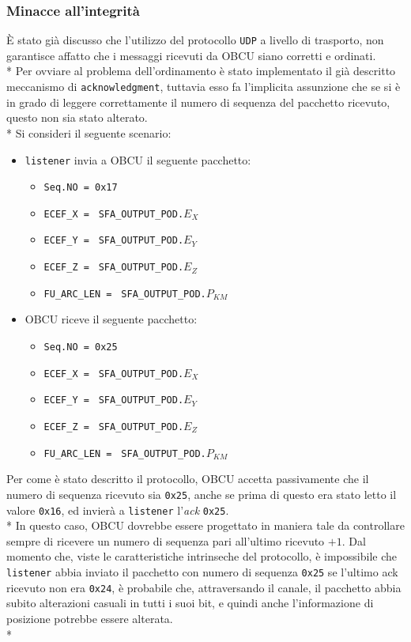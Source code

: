 \subsubsection{Minacce all'integrit\`a}
\`E stato gi\`a discusso che l'utilizzo del protocollo \texttt{UDP} a livello di trasporto, non garantisce affatto che i messaggi ricevuti da OBCU siano corretti e ordinati.\\*
Per ovviare al problema dell'ordinamento \`e stato implementato il gi\`a descritto meccanismo di \texttt{acknowledgment}, tuttavia esso fa l'implicita assunzione che se si \`e in grado di leggere correttamente il numero di sequenza del pacchetto ricevuto, questo non sia stato alterato.\\*
Si consideri il seguente scenario:
\begin{itemize}
	\item \texttt{listener} invia a OBCU il seguente pacchetto:
	\begin{itemize}
		\item \texttt{Seq.NO = 0x17}
		\item \texttt{ECEF\_X = } \texttt{SFA\_OUTPUT\_POD.}$E_X$
		\item \texttt{ECEF\_Y = } \texttt{SFA\_OUTPUT\_POD.}$E_Y$
		\item \texttt{ECEF\_Z = } \texttt{SFA\_OUTPUT\_POD.}$E_Z$
		\item \texttt{FU\_ARC\_LEN = } \texttt{SFA\_OUTPUT\_POD.}$P_{KM}$
	\end{itemize}
	\item OBCU riceve il seguente pacchetto:
\begin{itemize}
	\item \texttt{Seq.NO = 0x25}
	\item \texttt{ECEF\_X = } \texttt{SFA\_OUTPUT\_POD.}$E_X$
	\item \texttt{ECEF\_Y = } \texttt{SFA\_OUTPUT\_POD.}$E_Y$
	\item \texttt{ECEF\_Z = } \texttt{SFA\_OUTPUT\_POD.}$E_Z$
	\item \texttt{FU\_ARC\_LEN = } \texttt{SFA\_OUTPUT\_POD.}$P_{KM}$
\end{itemize}
\end{itemize}
Per come \`e stato descritto il protocollo, OBCU accetta passivamente che il numero di sequenza ricevuto sia \texttt{0x25}, anche se prima di questo era stato letto il valore \texttt{0x16}, ed invier\`a a \texttt{listener} l'\emph{ack} \texttt{0x25}.\\*
In questo caso, OBCU dovrebbe essere progettato in maniera tale da controllare sempre di ricevere un numero di sequenza pari all'ultimo ricevuto $+1$. Dal momento che, viste le caratteristiche intrinseche del protocollo, \`e impossibile che \texttt{listener} abbia inviato il pacchetto con numero di sequenza \texttt{0x25} se l'ultimo ack ricevuto non era \texttt{0x24}, \`e probabile che, attraversando il canale, il pacchetto abbia subito alterazioni casuali in tutti i suoi bit, e quindi anche l'informazione di posizione potrebbe essere alterata.\\*

